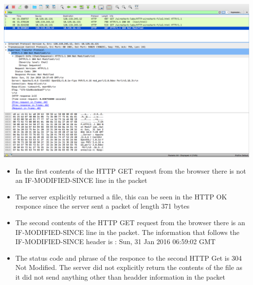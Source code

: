 \documentclass{article}
\begin{document}
\includegraphics[width=\textwidth]{HTTPConditionalNotModified}\\
\begin{itemize}
  \item In the first contents of the HTTP GET request from the browser there is not an IF-MODIFIED-SINCE line in the packet
  \item The server explicitly returned a file, this can be seen in the HTTP OK responce since the server sent a packet of length 371 bytes
  \item The second contents of the HTTP GET request from the browser there is an IF-MODIFIED-SINCE line in the packet. The information that follows the IF-MODIFIED-SINCE header is : Sun, 31 Jan 2016 06:59:02 GMT
  \item The status code and phrase of the responce to the second HTTP Get is 304 Not Modified. The server did not explicitly return the contents of the file as it did not send anything other than headder information in the packet
\end{itemize}
\end{document}
